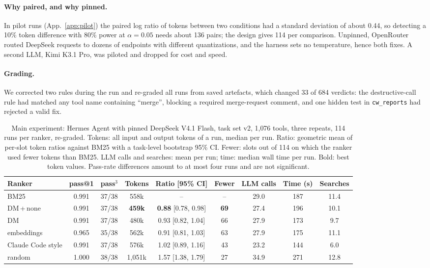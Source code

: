 \documentclass[11pt]{article}
\newcommand{\dmn}{DM\,+\,none}
\begin{document}
\paragraph{Why paired, and why pinned.} In pilot runs (App.~\ref{app:pilot}) the paired log ratio of tokens
between two conditions had a standard deviation of about 0.44, so detecting a 10\% token difference with 80\%
power at $\alpha=0.05$ needs about 136 pairs; the design gives 114 per comparison. Unpinned, OpenRouter routed
DeepSeek requests to dozens of endpoints with different quantizations, and the harness sets no temperature, hence
both fixes. A second LLM, Kimi K3.1 Pro, was piloted and dropped for cost and speed.

\paragraph{Grading.} We corrected two rules during the run and re-graded all runs from saved artefacts, which
changed 33 of 684 verdicts: the destructive-call rule had matched any tool name containing ``merge'', blocking a
required merge-request comment, and one hidden test in \texttt{cw\_reports} had rejected a valid fix.

\begin{table}[t]
\centering\footnotesize
\caption{Main experiment: Hermes Agent with pinned DeepSeek V4.1 Flash, task set v2, 1{,}076 tools, three
repeats, 114 runs per ranker, re-graded. Tokens: all input and output tokens of a run, median per run. Ratio:
geometric mean of per-slot token ratios against BM25 with a task-level bootstrap 95\% CI. Fewer: slots out of 114
on which the ranker used fewer tokens than BM25. LLM calls and searches: mean per run; time: median wall time per
run. Bold: best token values. Pass-rate differences amount to at most four runs and are not significant.}
\label{tab:final}
\setlength{\tabcolsep}{4pt}
\begin{tabular}{@{}lcccccccc@{}}
\toprule
Ranker & pass@1 & pass$^3$ & Tokens & Ratio [95\% CI] & Fewer & LLM calls & Time (s) & Searches \\
\midrule
BM25 & 0.991 & 37/38 & 558k & -- & -- & 29.0 & 187 & 11.4 \\
\dmn{} & 0.991 & 37/38 & \textbf{459k} & \textbf{0.88} [0.78, 0.98] & \textbf{69} & 27.4 & 196 & 10.1 \\
DM & 0.991 & 37/38 & 480k & 0.93 [0.82, 1.04] & 66 & 27.9 & 173 & 9.7 \\
embeddings & 0.965 & 35/38 & 562k & 0.91 [0.81, 1.03] & 63 & 27.9 & 175 & 11.1 \\
Claude Code style & 0.991 & 37/38 & 576k & 1.02 [0.89, 1.16] & 43 & 23.2 & 144 & 6.0 \\
random & 1.000 & 38/38 & 1{,}051k & 1.57 [1.38, 1.79] & 27 & 34.9 & 271 & 12.8 \\
\bottomrule
\end{tabular}
\end{table}
\end{document}
